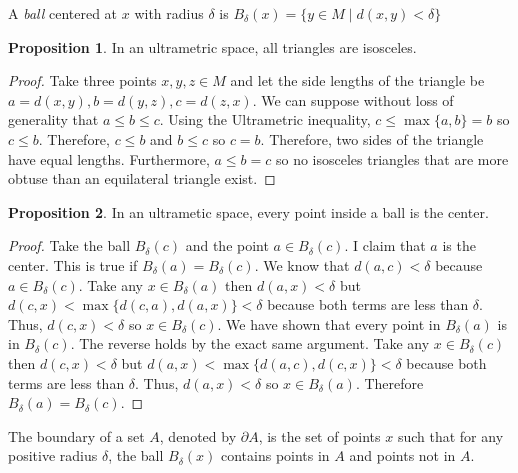 \documentclass{article}
\newcommand{\ball}[2]{B_{#1} \! \left(#2 \right)}
\newenvironment{definition}[1][Definition:]{\begin{trivlist}
\item[\hskip \labelsep {\bfseries #1}]}{\end{trivlist}}
\theoremstyle{theorem}
\theoremstyle{definition}
\theoremstyle{definition}
\newtheorem*{proposition}{Proposition}
\theoremstyle{remark}
\theoremstyle{definition}
\theoremstyle{remark}
\begin{document}
\begin{definition}
A \textit{ball} centered at $x$ with radius $\delta$ is $\ball{\delta}{x} = \{y \in M \mid d(x, y) < \delta\}$ 
\end{definition}

\begin{proposition}
In an ultrametric space, all triangles are isosceles.
\end{proposition}

\begin{proof}
Take three points $x,y,z \in M$ and let the side lengths of the triangle be $a = d(x,y), b = d(y, z), c = d(z, x)$. We can suppose without loss of generality that $a \le b \le c$. Using the Ultrametric inequality, $c \le \max\{a,b\} = b$ so $c \le b$. Therefore, $c \le b$ and $b \le c$ so $c = b$. Therefore, two sides of the triangle have equal lengths. Furthermore, $a \le b = c$ so no isosceles triangles that are more obtuse than an equilateral triangle exist.
\end{proof}

\begin{proposition}
In an ultrametic space, every point inside a ball is the center.
\end{proposition}

\begin{proof}
Take the ball $\ball{\delta}{c}$ and the point $a \in \ball{\delta}{c}$. I claim that $a$ is the center. This is true if $\ball{\delta}{a} = \ball{\delta}{c}$. We know that $d(a,c) < \delta$ because $a \in \ball{\delta}{c}$. Take any $x \in \ball{\delta}{a}$ then $d(a, x) < \delta$ but $d(c, x) < \max\{d(c, a), d(a, x)\} < \delta$ because both terms are less than $\delta$. Thus, $d(c, x) < \delta$ so $x \in \ball{\delta}{c}$. We have shown that every point in $\ball{\delta}{a}$ is in $\ball{\delta}{c}$. The reverse holds by the exact same argument. Take any $x \in \ball{\delta}{c}$ then $d(c, x) < \delta$ but $d(a, x) < \max\{d(a, c), d(c, x)\} < \delta$ because both terms are less than $\delta$. Thus, $d(a, x) < \delta$ so $x \in \ball{\delta}{a}$. Therefore $\ball{\delta}{a} = \ball{\delta}{c}$. 
\end{proof}

\begin{definition}
The boundary of a set $A$, denoted by $\partial A$, is the set of points $x$ such that for any positive radius $\delta$, the ball $\ball{\delta}{x}$ contains points in $A$ and points not in $A$.
\end{definition} 
\end{document}
